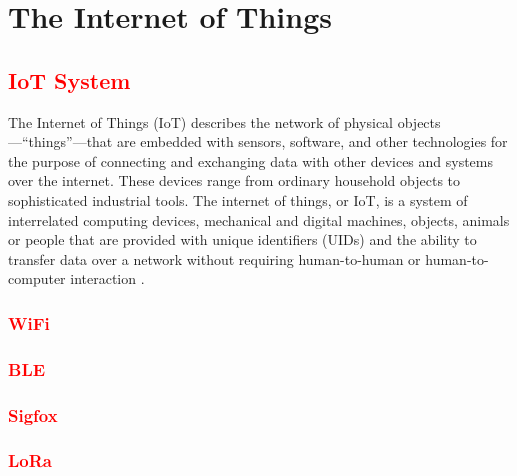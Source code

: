\chapter{The Internet of Things}

\section{\textcolor{red}{IoT System}}
The Internet of Things (IoT) describes the network of physical objects—“things”—that are embedded with sensors, software, and other technologies for the purpose of connecting and exchanging data with other devices and systems over the internet. These devices range from ordinary household objects to sophisticated industrial tools. The internet of things, or IoT, is a system of interrelated computing devices, mechanical and digital machines, objects, animals or people that are provided with unique identifiers (UIDs) and the ability to transfer data over a network without requiring human-to-human or human-to-computer interaction \cite[see][1]{Babulo:2023}.   

 
\subsection {\textcolor{red}{WiFi}}

\subsection {\textcolor{red}{BLE}}
\subsection{\textcolor{red}{Sigfox}}
\subsection{\textcolor{red}{LoRa}}